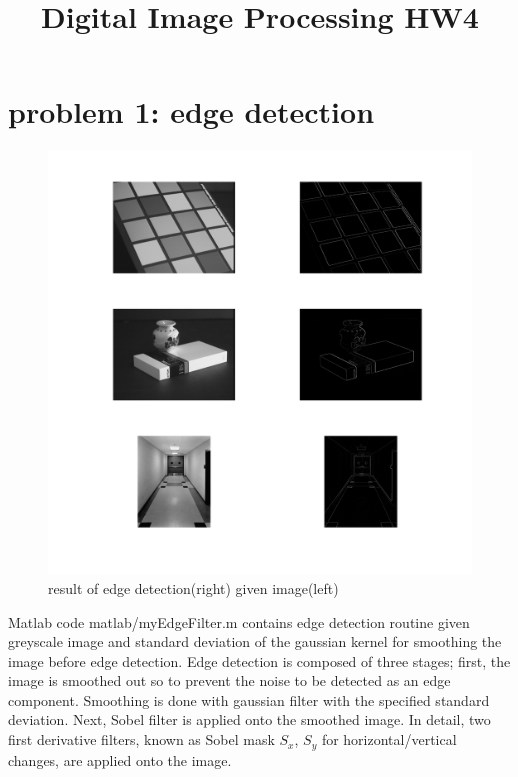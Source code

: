 \documentclass[extendedabs]{bmvc2k}
\begin{document}
\title{Digital Image Processing HW4}

\maketitle
\vspace{-0.2in}

\section*{problem 1: edge detection}

\begin{figure}[h]
    \centering
    \includegraphics[width=\linewidth]{hw4_1_1}
    \caption{result of edge detection(right) given image(left)}
    \label{fig:1}
\end{figure}

Matlab code matlab/myEdgeFilter.m contains edge detection routine given greyscale image and standard deviation
of the gaussian kernel for smoothing the image before edge detection. Edge detection is composed of three stages;
first, the image is smoothed out so to prevent the noise to be detected as an edge component. Smoothing is done with
gaussian filter with the specified standard deviation. Next, Sobel filter is applied onto the smoothed image. In detail,
two first derivative filters, known as Sobel mask $S_x$, $S_y$ for horizontal/vertical changes, are applied onto the image. 
\end{document}
